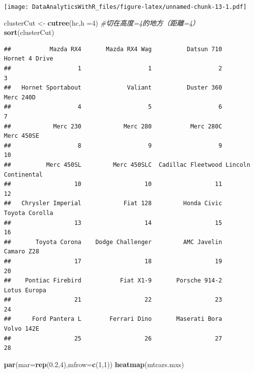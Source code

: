 \documentclass[
]{book}
\newenvironment{Shaded}{\begin{snugshade}}{\end{snugshade}}
\newcommand{\CommentTok}[1]{\textcolor[rgb]{0.56,0.35,0.01}{\textit{#1}}}
\newcommand{\DataTypeTok}[1]{\textcolor[rgb]{0.13,0.29,0.53}{#1}}
\newcommand{\DecValTok}[1]{\textcolor[rgb]{0.00,0.00,0.81}{#1}}
\newcommand{\FloatTok}[1]{\textcolor[rgb]{0.00,0.00,0.81}{#1}}
\newcommand{\KeywordTok}[1]{\textcolor[rgb]{0.13,0.29,0.53}{\textbf{#1}}}
\newcommand{\NormalTok}[1]{#1}
\newcommand{\StringTok}[1]{\textcolor[rgb]{0.31,0.60,0.02}{#1}}
\begin{document}
\texttt{[image: DataAnalyticsWithR\_files/figure-latex/unnamed-chunk-13-1.pdf]}

\begin{Shaded}
\begin{Highlighting}[]
\NormalTok{clusterCut <-}\StringTok{ }\KeywordTok{cutree}\NormalTok{(hc,}\DataTypeTok{h =}\DecValTok{4}\NormalTok{) }\CommentTok{#切在高度=4的地方（距離=4）}
\KeywordTok{sort}\NormalTok{(clusterCut)}
\end{Highlighting}
\end{Shaded}

\begin{verbatim}
##           Mazda RX4       Mazda RX4 Wag          Datsun 710      Hornet 4 Drive 
##                   1                   1                   2                   3 
##   Hornet Sportabout             Valiant          Duster 360           Merc 240D 
##                   4                   5                   6                   7 
##            Merc 230            Merc 280           Merc 280C          Merc 450SE 
##                   8                   9                   9                  10 
##          Merc 450SL         Merc 450SLC  Cadillac Fleetwood Lincoln Continental 
##                  10                  10                  11                  12 
##   Chrysler Imperial            Fiat 128         Honda Civic      Toyota Corolla 
##                  13                  14                  15                  16 
##       Toyota Corona    Dodge Challenger         AMC Javelin          Camaro Z28 
##                  17                  18                  19                  20 
##    Pontiac Firebird           Fiat X1-9       Porsche 914-2        Lotus Europa 
##                  21                  22                  23                  24 
##      Ford Pantera L        Ferrari Dino       Maserati Bora          Volvo 142E 
##                  25                  26                  27                  28
\end{verbatim}

\begin{Shaded}
\begin{Highlighting}[]
\KeywordTok{par}\NormalTok{(}\DataTypeTok{mar=}\KeywordTok{rep}\NormalTok{(}\FloatTok{0.2}\NormalTok{,}\DecValTok{4}\NormalTok{),}\DataTypeTok{mfrow=}\KeywordTok{c}\NormalTok{(}\DecValTok{1}\NormalTok{,}\DecValTok{1}\NormalTok{))}
\KeywordTok{heatmap}\NormalTok{(mtcars.mxs)}
\end{Highlighting}
\end{Shaded}
\end{document}
